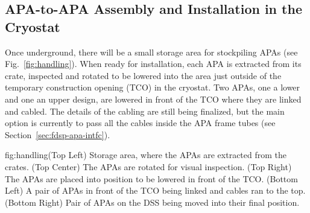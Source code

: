 \subsection{APA-to-APA Assembly and Installation in the Cryostat}
\label{sec:fdsp-apa-install-cryostat}

Once underground, there will be a small storage area for stockpiling APAs (see Fig.~\ref{fig:handling}). When ready for installation, each APA is extracted from its crate, inspected and rotated to be lowered into the area just outside of the temporary construction opening (TCO) in the cryostat. Two APAs, one a lower and one an upper design, are lowered in front of the TCO where they are linked and cabled. The details of the cabling are still being finalized, but the main option is currently to pass all the cables inside the APA frame tubes (see Section~\ref{sec:fdsp-apa-intfc}).

\begin{dunefigure}{fig:handling}{(Top Left) Storage area, where the APAs are extracted from the crates. (Top Center) The APAs are rotated for visual inspection. (Top Right) The APAs are placed into position to be lowered in front of the TCO. (Bottom Left) A pair of APAs in front of the TCO being linked and cables ran to the top. (Bottom Right) Pair of APAs on the DSS being moved into their final position.}
\setlength{\fboxsep}{0pt}
\setlength{\fboxrule}{0.5pt}
\centering
{} 
\\ \vspace*{1.5mm}
\hspace*{-.25mm}
\hspace*{1.mm}
\end{dunefigure}


